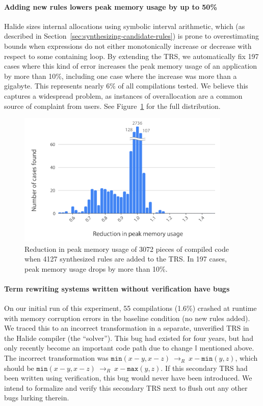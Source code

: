 \documentclass[acmsmall,review,anonymous]{acmart}\settopmatter{printfolios=true,printccs=false,printacmref=false}
\newcommand{\hmax}[0]{\texttt{max}}
\newcommand{\hmin}[0]{\texttt{min}}
\newcommand{\rewrites}[0]{\:\rightarrow_{R}\:}
\begin{document}
\paragraph{Adding new rules lowers peak memory usage by up to 50\%}
Halide sizes internal allocations using symbolic interval arithmetic,
which (as described in Section~\ref{sec:synthesizing-candidate-rules})
is prone to overestimating bounds when
expressions do not either monotonically increase or decrease with
respect to some containing loop. By extending the TRS, we
automatically fix 197 cases where this kind of error increases the
peak memory usage of an application by more than 10\%, including one
case where the increase was more than a gigabyte. This represents
nearly 6\% of all compilations tested. We believe this captures a
widespread problem, as instances of overallocation are a common source
of complaint from users. See Figure~\ref{fig:peakmemoryhistogram} for
the full distribution. 

\begin{figure}
  \includegraphics[width=4in]{figures/memoryhistogram.pdf}
\caption{Reduction in peak memory usage of 3072 pieces of compiled
  code when 4127 synthesized rules are added to the TRS. In 197 cases,
  peak memory usage drops by more than 10\%.}
\label{fig:peakmemoryhistogram}
\end{figure}

\paragraph{Term rewriting systems written without verification have bugs}
On our initial run of this experiment, 55 compilations (1.6\%) crashed
at runtime with memory corruption errors in the baseline condition (no
new rules added). We traced this to an incorrect transformation in a
separate, unverified TRS in the Halide compiler (the ``solver''). This
bug had existed for four years, but had only recently become an
important code path due to change $\mathbb{I}$ mentioned above. The
incorrect transformation was $\hmin(x - y, x - z) \rewrites x - \hmin(y, z)$,
which should be $\hmin(x - y, x - z) \rewrites x - \hmax(y, z)$. If this
secondary TRS had been written using verification, this bug would
never have been introduced. We intend to formalize and verify this
secondary TRS next to flush out any other bugs lurking therein.
\end{document}
